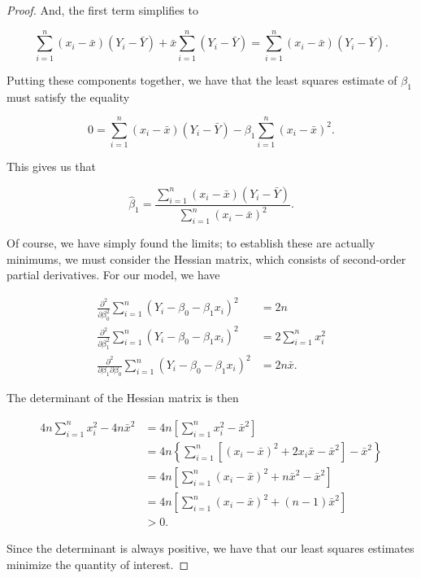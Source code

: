 \documentclass[
  letterpaper,
  DIV=11,
  numbers=noendperiod]{scrreprt}
\theoremstyle{definition}
\theoremstyle{plain}
\theoremstyle{definition}
\theoremstyle{remark}
\begin{document}
\begin{proof}
And, the first term simplifies to

\[\sum_{i=1}^{n} \left(x_i - \bar{x}\right)\left(Y_i - \bar{Y}\right) + \bar{x} \sum_{i=1}^{n} \left(Y_i - \bar{Y}\right) = \sum_{i=1}^{n} \left(x_i - \bar{x}\right)\left(Y_i - \bar{Y}\right).\]

Putting these components together, we have that the least squares
estimate of \(\beta_1\) must satisfy the equality

\[0 = \sum_{i=1}^{n} \left(x_i - \bar{x}\right)\left(Y_i - \bar{Y}\right) - \beta_1 \sum_{i=1}^{n} \left(x_i - \bar{x}\right)^2.\]

This gives us that

\[\widehat{\beta}_1 = \frac{\sum_{i=1}^{n} \left(x_i - \bar{x}\right)\left(Y_i - \bar{Y}\right)}{\sum_{i=1}^{n} \left(x_i - \bar{x}\right)^2}.\]

Of course, we have simply found the limits; to establish these are
actually minimums, we must consider the Hessian matrix, which consists
of second-order partial derivatives. For our model, we have

\[
\begin{aligned}
  \frac{\partial^2}{\partial \beta_0^2} \sum_{i=1}^{n} \left(Y_i - \beta_0 - \beta_1 x_i\right)^2
    &= 2n \\
  \frac{\partial^2}{\partial \beta_1^2} \sum_{i=1}^{n} \left(Y_i - \beta_0 - \beta_1 x_i\right)^2
    &= 2\sum_{i=1}^{n} x_i^2\\
  \frac{\partial^2}{\partial \beta_1 \partial \beta_0} \sum_{i=1}^{n} \left(Y_i - \beta_0 - \beta_1 x_i\right)^2  
    &= 2n\bar{x}.
\end{aligned}
\]

The determinant of the Hessian matrix is then

\[
\begin{aligned}
  4n\sum_{i=1}^{n} x_i^2 - 4n\bar{x}^2 
    &= 4n\left[\sum_{i=1}^{n} x_i^2 - \bar{x}^2\right] \\
    &= 4n\left\{\sum_{i=1}^{n} \left[\left(x_i - \bar{x}\right)^2 + 2x_i\bar{x} - \bar{x}^2\right] - \bar{x}^2\right\} \\
    &= 4n \left[\sum_{i=1}^{n} \left(x_i - \bar{x}\right)^2 + n\bar{x}^2 - \bar{x}^2\right] \\
    &= 4n \left[\sum_{i=1}^{n} \left(x_i - \bar{x}\right)^2 + (n - 1)\bar{x}^2\right] \\
    &> 0.
\end{aligned}
\]

Since the determinant is always positive, we have that our least squares
estimates minimize the quantity of interest.
\end{proof}
\end{document}
